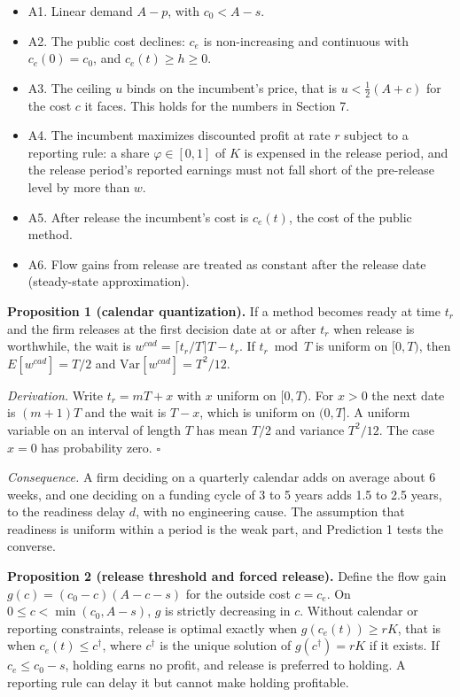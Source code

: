 \documentclass[10pt,letterpaper]{article}
\providecommand{\tightlist}{\setlength{\itemsep}{1pt}\setlength{\parskip}{0pt}}
\begin{document}
\begin{itemize}
\tightlist
\item
  A1. Linear demand \(A - p\), with \(c_0 < A - s\).
\item
  A2. The public cost declines: \(c_e\) is non-increasing and continuous
  with \(c_e(0) = c_0\), and \(c_e(t) \ge h \ge 0\).
\item
  A3. The ceiling \(u\) binds on the incumbent's price, that is
  \(u < \tfrac12 (A + c)\) for the cost \(c\) it faces. This holds for
  the numbers in Section 7.
\item
  A4. The incumbent maximizes discounted profit at rate \(r\) subject to
  a reporting rule: a share \(\varphi \in [0,1]\) of \(K\) is expensed
  in the release period, and the release period's reported earnings must
  not fall short of the pre-release level by more than \(w\).
\item
  A5. After release the incumbent's cost is \(c_e(t)\), the cost of the
  public method.
\item
  A6. Flow gains from release are treated as constant after the release
  date (steady-state approximation).
\end{itemize}

\textbf{Proposition 1 (calendar quantization).} If a method becomes
ready at time \(t_r\) and the firm releases at the first decision date
at or after \(t_r\) when release is worthwhile, the wait is
\(w^{cad} = \lceil t_r / T \rceil T - t_r\). If \(t_r \bmod T\) is
uniform on \([0, T)\), then \(E[w^{cad}] = T/2\) and
\(\mathrm{Var}[w^{cad}] = T^2/12\).

\emph{Derivation.} Write \(t_r = mT + x\) with \(x\) uniform on
\([0,T)\). For \(x > 0\) the next date is \((m+1)T\) and the wait is
\(T - x\), which is uniform on \((0, T]\). A uniform variable on an
interval of length \(T\) has mean \(T/2\) and variance \(T^2/12\). The
case \(x = 0\) has probability zero. \(\square\)

\emph{Consequence.} A firm deciding on a quarterly calendar adds on
average about 6 weeks, and one deciding on a funding cycle of 3 to 5
years adds 1.5 to 2.5 years, to the readiness delay \(d\), with no
engineering cause. The assumption that readiness is uniform within a
period is the weak part, and Prediction 1 tests the converse.

\textbf{Proposition 2 (release threshold and forced release).} Define
the flow gain \(g(c) = (c_0 - c)(A - c - s)\) for the outside cost
\(c = c_e\). On \(0 \le c < \min(c_0, A - s)\), \(g\) is strictly
decreasing in \(c\). Without calendar or reporting constraints, release
is optimal exactly when \(g(c_e(t)) \ge rK\), that is when
\(c_e(t) \le c^\dagger\), where \(c^\dagger\) is the unique solution of
\(g(c^\dagger) = rK\) if it exists. If \(c_e \le c_0 - s\), holding
earns no profit, and release is preferred to holding. A reporting rule
can delay it but cannot make holding profitable.
\end{document}
